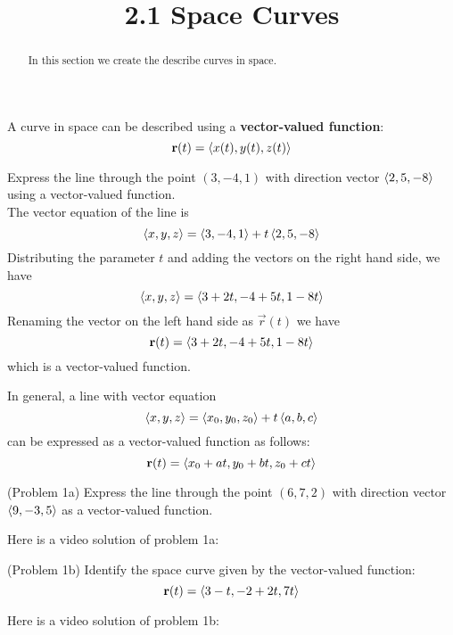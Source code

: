 \documentclass[handout]{ximera}
\title{2.1 Space Curves}
\begin{document}
\begin{abstract}
In this section we create the describe curves in space.
\end{abstract}

\maketitle

A curve in space can be described using a \textbf{vector-valued function}:
\[
\mathbf r(t) = \left\langle x(t), y(t), z(t)\right\rangle
\]

\begin{example}[Example 1]
Express the line through the point $(3, -4, 1)$ with direction vector $\left\langle 2, 5, -8\right\rangle$ using a vector-valued function.\\
The vector equation of the line is 
\[
\left\langle x, y, z\right\rangle = \left\langle 3, -4, 1\right\rangle + t\left\langle 2, 5, -8\right\rangle
\]
Distributing the parameter $t$ and adding the vectors on the right hand side, we have
\[
\left\langle x, y, z\right\rangle = \left\langle 3+2t,-4+ 5t, 1-8t\right\rangle
\]
Renaming the vector on the left hand side as $\vec r(t)$ we have
\[
\mathbf r(t) = \left\langle 3+2t,-4+ 5t, 1-8t\right\rangle
\]
which is a vector-valued function.

\end{example}

\begin{remark}

In general, a line with vector equation
\[
\left\langle x, y, z\right\rangle = \left\langle x_0, y_0, z_0\right\rangle + t\left\langle a, b, c\right\rangle
\]
can be expressed as a vector-valued function as follows:
\[
\mathbf r(t) = \left\langle x_0 + at, y_0 + bt, z_0 + ct\right\rangle
\]
\end{remark}

\begin{problem}(Problem 1a)
Express the line through the point $(6, 7, 2)$ with direction vector $\left\langle 9, -3, 5\right\rangle$ as a vector-valued function.
\end{problem}

Here is a video solution of problem 1a:\\
\begin{foldable}
\end{foldable}

\begin{problem}(Problem 1b)
Identify the space curve given by the vector-valued function:
\[
\mathbf r(t) = \left\langle 3 -t, -2 + 2t, 7t\right\rangle
\]
\end{problem}  
Here is a video solution of problem 1b:\\
\begin{foldable}
\end{foldable}
\end{document}
